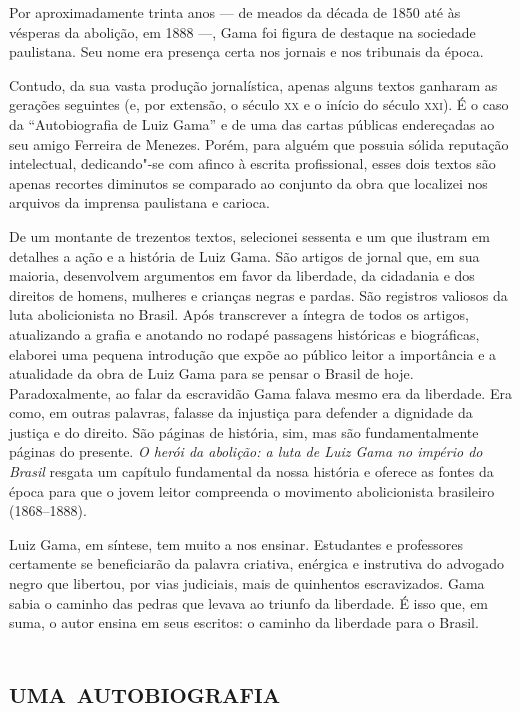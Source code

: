 Por aproximadamente trinta anos --- de meados da década de 1850 até às
vésperas da abolição, em 1888 ---, Gama foi figura de destaque na
sociedade paulistana. Seu nome era presença certa nos jornais e nos
tribunais da época.

Contudo, da sua vasta produção jornalística, apenas alguns textos
ganharam as gerações seguintes (e, por extensão, o século \textsc{xx} e o início
do século \textsc{xxi}). É o caso da ``Autobiografia de Luiz Gama'' e de uma das
cartas públicas endereçadas ao seu amigo Ferreira de Menezes. Porém,
para alguém que possuia sólida reputação intelectual, dedicando"-se com
afinco à escrita profissional, esses dois textos são apenas recortes
diminutos se comparado ao conjunto da obra que localizei nos arquivos da
imprensa paulistana e carioca.

De um montante de trezentos textos, selecionei sessenta e um que
ilustram em detalhes a ação e a história de Luiz Gama. São artigos de
jornal que, em sua maioria, desenvolvem argumentos em favor da
liberdade, da cidadania e dos direitos de homens, mulheres e crianças
negras e pardas. São registros valiosos da luta abolicionista no Brasil.
Após transcrever a íntegra de todos os artigos, atualizando a grafia e
anotando no rodapé passagens históricas e biográficas, elaborei uma
pequena introdução que expõe ao público leitor a importância e a
atualidade da obra de Luiz Gama para se pensar o Brasil de hoje.
Paradoxalmente, ao falar da escravidão Gama falava mesmo era da
liberdade. Era como, em outras palavras, falasse da injustiça para
defender a dignidade da justiça e do direito. São páginas de história,
sim, mas são fundamentalmente páginas do presente. \emph{O herói
da abolição: a luta de Luiz Gama no império do Brasil} resgata um capítulo
fundamental da nossa história e oferece as fontes da época para que o
jovem leitor compreenda o movimento abolicionista brasileiro
(1868--1888).

Luiz Gama, em síntese, tem muito a nos ensinar. Estudantes e professores
certamente se beneficiarão da palavra criativa, enérgica e instrutiva do
advogado negro que libertou, por vias judiciais, mais de quinhentos
escravizados. Gama sabia o caminho das pedras que levava ao triunfo da
liberdade. É isso que, em suma, o autor ensina em seus escritos: o
caminho da liberdade para o Brasil.


\paginabranca
\begingroup\makeatletter\@openrightfalse
\part{\textsc{uma autobiografia}}

